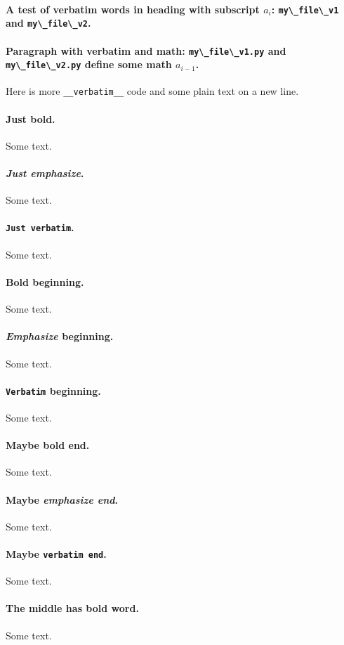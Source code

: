 \documentclass[%
oneside,                 %
final,                   %
10pt]{article}
\theoremstyle{definition}
\begin{document}
\begin{enumerate}
\paragraph{A test of verbatim words in heading with subscript $a_i$: \protect\Verb!my\_file\_v1! and \protect\Verb!my\_file\_v2!.}
\paragraph{Paragraph with verbatim and math: \protect\Verb!my\_file\_v1.py! and \protect\Verb!my\_file\_v2.py! define some math $a_{i-1}$.}
Here is more \Verb!__verbatim__! code and
some plain text on a new line.
\paragraph{\textbf{Just bold}.}
Some text.
\paragraph{\emph{Just emphasize}.}
Some text.
\paragraph{\texttt{Just verbatim}.}
Some text.
\paragraph{\textbf{Bold} beginning.}
Some text.
\paragraph{\emph{Emphasize} beginning.}
Some text.
\paragraph{\texttt{Verbatim} beginning.}
Some text.
\paragraph{Maybe \textbf{bold end}.}
Some text.
\paragraph{Maybe \emph{emphasize end}.}
Some text.
\paragraph{Maybe \texttt{verbatim end}.}
Some text.
\paragraph{The middle has \textbf{bold} word.}
Some text.

\end{enumerate}
\end{document}
